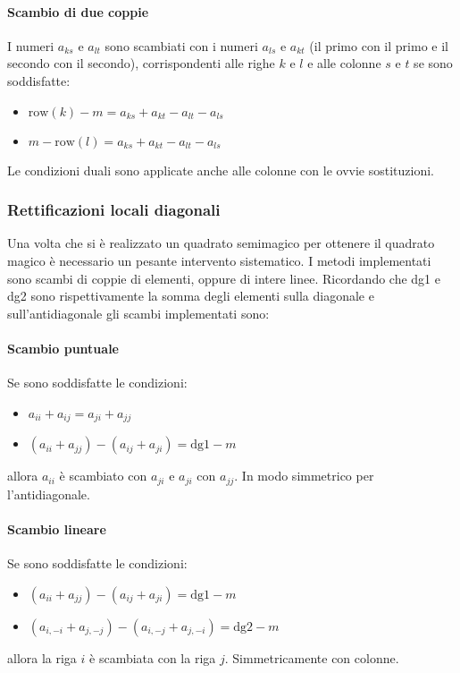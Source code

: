 \documentclass[italian,twoside,twocolumn]{article}
\begin{document}
\paragraph{Scambio di due coppie} I numeri $ a_{ks} $ e $ a_{lt} $ sono scambiati con i numeri $ a_{ls} $ e $ a_{kt} $ (il primo con il primo e il secondo con il secondo), corrispondenti alle righe $ k $ e $ l $ e alle colonne $ s $ e $ t $ se sono soddisfatte:
\begin{itemize}
	\item $ \text{row}(k) - \mathit{m} = a_{ks} + a_{kt} -a_{lt} - a_{ls} $
	\item $ \mathit{m} - \text{row}(l) = a_{ks} + a_{kt} -a_{lt} - a_{ls} $
\end{itemize}

Le condizioni duali sono applicate anche alle colonne con le ovvie sostituzioni.  

\subsubsection{Rettificazioni locali diagonali}
Una volta che si è realizzato un quadrato semimagico per ottenere il quadrato magico è necessario un pesante intervento sistematico.
I metodi implementati sono scambi di coppie di elementi, oppure di intere linee. Ricordando che dg1 e dg2 sono rispettivamente la somma degli elementi sulla diagonale e sull'antidiagonale gli scambi implementati sono:

\paragraph{Scambio puntuale} 
Se sono soddisfatte le condizioni:
\begin{itemize}
	\item $ a_{ii} + a_{ij} = a_{ji} + a_{jj} $
	\item $ \left(a_{ii} +  a_{jj} \right) - \left(a_{ij} +  a_{ji} \right) = \text{dg1} - \mathit{m}$
\end{itemize}
allora $ a_{ii} $ è scambiato con $ a_{ji} $ e $ a_{ji} $ con $ a_{jj} $. In modo simmetrico per l'antidiagonale.

\paragraph{Scambio lineare}
Se sono soddisfatte le condizioni:
\begin{itemize}
	\item $ \left(a_{ii} +  a_{jj} \right) - \left(a_{ij} +  a_{ji} \right) = \text{dg1} - \mathit{m}$
	\item $ \left(a_{i,-i} + a_{j,-j}\right) - \left(a_{i,-j} + a_{j,-i}\right) = \text{dg2} - \mathit{m}$
\end{itemize}
allora la riga $ i $ è scambiata con la riga $ j $. Simmetricamente con colonne.
\end{document}
